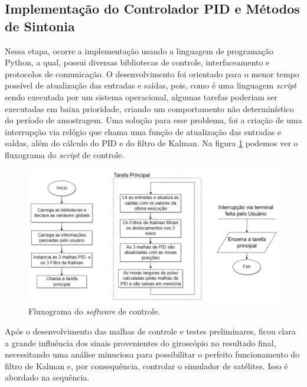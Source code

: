 
\subsection{Implementação do Controlador PID e Métodos de Sintonia}

Nessa etapa, ocorre a implementação usando a linguagem de programação Python, a qual, possui diversas bibliotecas de controle, interfaceamento e protocolos de comunicação. O desenvolvimento foi orientado para o menor tempo possível de atualização das entradas e saídas, pois, como é uma linguagem \textit{script} sendo executada por um sistema operacional, algumas tarefas poderiam ser executadas em baixa prioridade, criando um comportamento não determinístico do período de amostragem. Uma solução para esse problema, foi a criação de uma interrupção via relógio que chama uma função de atualização das entradas e saídas, além do cálculo do PID e do filtro de Kalman. Na figura \ref{fig:software_model} podemos ver o fluxograma do \textit{script} de controle.

\begin{figure}[H]
  \caption{Fluxograma do \textit{software} de controle.}
  \begin{center}
      \includegraphics[scale=.65]{metodologia/img/software_model}
  \end{center}
  \label{fig:software_model}
\end{figure}

Após o desenvolvimento das malhas de controle e testes preliminares, ficou clara a grande influência dos sinais provenientes do giroscópio no resultado final, necessitando uma análise minuciosa para possibilitar o perfeito funcionamento do filtro de Kalman e, por consequência, controlar o simulador de satélites. Isso é abordado na sequência. 


